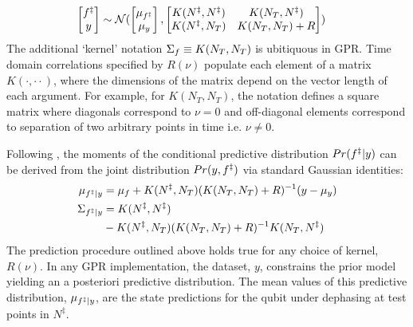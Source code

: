 \begin{align}
\begin{bmatrix} f^{\ddagger} \\y \end{bmatrix} & \sim \mathcal{N} (\begin{bmatrix} \mu_{f^{\ddagger}} \\ \mu_y
\end{bmatrix} , \begin{bmatrix}   K(N^{\ddagger},N^{\ddagger})&K(N_T,N^{\ddagger}) \\ K(N^{\ddagger},N_T) & K(N_T,N_T) + R \end{bmatrix} )
\end{align}
The additional `kernel' notation $\Sigma_f  \equiv K(N_T, N_T)$ is ubitiquous in GPR. Time domain correlations specified by $R(\nu)$ populate each element of a matrix $K(\cdot, \cdot \cdot)$, where the dimensions of the matrix depend on the vector length of each argument. For example, for $K(N_T,N_T)$, the notation defines a square matrix where diagonals correspond to $\nu=0$ and off-diagonal elements correspond to separation of two arbitrary points in time i.e. $\nu \neq 0 $. 
 
Following \cite{rasmussen2005gaussian}, the moments of the conditional predictive distribution $Pr(f^{\ddagger}|y)$ can be derived from the joint distribution $Pr(y,f^{\ddagger})$ via standard Gaussian identities:
\begin{align}
\mu_{f^{\ddagger}|y} &= \mu_f + K(N^{\ddagger},N_T)(K(N_T,N_T) + R )^{-1} (y - \mu_y) \\
\Sigma_{f^{\ddagger}|y} &= K(N^{\ddagger},N^{\ddagger}) \nonumber \\
& - K(N^{\ddagger},N_T)(K(N_T, N_T) + R)^{-1}K(N_T,N^{\ddagger}) 
\end{align}
The prediction procedure outlined above holds true for any choice of kernel, $R(\nu)$. In any GPR implementation, the dataset, $y$, constrains the prior model yielding an a posteriori predictive distribution. The mean values of this predictive distribution, $\mu_{f^{\ddagger}|y}$, are the state predictions for the qubit under dephasing at test points in $N^{\ddagger}$.

